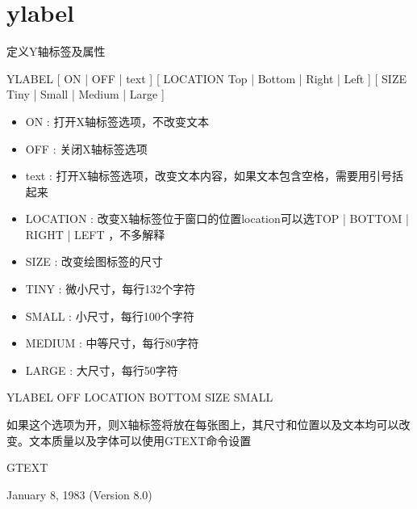 \section{ylabel}
\label{cmd:ylabel}

定义Y轴标签及属性

YLABEL [ ON | OFF | text ] [ LOCATION Top | Bottom | Right | Left ] [ SIZE Tiny | Small | Medium | Large ]

\begin{itemize}
\item ON : 打开X轴标签选项，不改变文本 
\item OFF : 关闭X轴标签选项 
\item text : 打开X轴标签选项，改变文本内容，如果文本包含空格，需要用引号括起来
\item LOCATION : 改变X轴标签位于窗口的位置location可以选TOP | BOTTOM | RIGHT | LEFT ，不多解释
\item SIZE :  改变绘图标签的尺寸 
\item TINY : 微小尺寸，每行132个字符
\item SMALL :  小尺寸，每行100个字符 
\item MEDIUM : 中等尺寸，每行80字符 
\item LARGE : 大尺寸，每行50字符 
\end{itemize}

YLABEL OFF LOCATION BOTTOM SIZE SMALL

如果这个选项为开，则X轴标签将放在每张图上，其尺寸和位置以及文本均可以改变。文本质量以及字体可以使用GTEXT命令设置

GTEXT

January 8, 1983 (Version 8.0)
